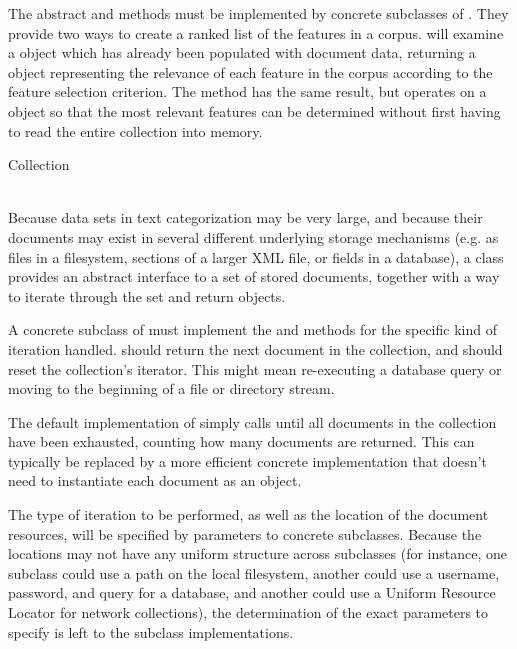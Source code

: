 \begin{description}
The abstract  and 
methods must be implemented by concrete subclasses of
.  They provide two ways to create a ranked
list of the features in a corpus.   will
examine a  object which has already been populated
with document data, returning a  object
representing the relevance of each feature in the corpus according to
the feature selection criterion.  The  method
has the same result, but operates on a  object so
that the most relevant features can be determined without first having
to read the entire collection into memory.

\item
\begin{abstractclass}{Collection}
 \attributes
 \methods
   \\
   \\
\end{abstractclass}

Because data sets in text categorization may be very large, and
because their documents may exist in several different underlying
storage mechanisms (e.g. as files in a filesystem, sections of a
larger XML file, or fields in a database), a  class provides
an abstract interface to a set of stored documents, together with a
way to iterate through the set and return  objects.

A concrete subclass of  must implement the
 and  methods for the specific kind of
iteration handled.   should return the next document in
the collection, and  should reset the collection's
iterator.  This might mean re-executing a database query or moving to
the beginning of a file or directory stream.

The default implementation of  simply calls
 until all documents in the collection have been
exhausted, counting how many documents are returned.  This can
typically be replaced by a more efficient concrete implementation that
doesn't need to instantiate each document as an object.

The type of iteration to be performed, as well as the location of the
document resources, will be specified by parameters to concrete
subclasses.  Because the locations may not have any uniform structure
across subclasses (for instance, one subclass could use a path on the
local filesystem, another could use a username, password, and query
for a database, and another could use a Uniform Resource Locator for
network collections), the determination of the exact parameters to
specify is left to the subclass implementations.


\end{description}
